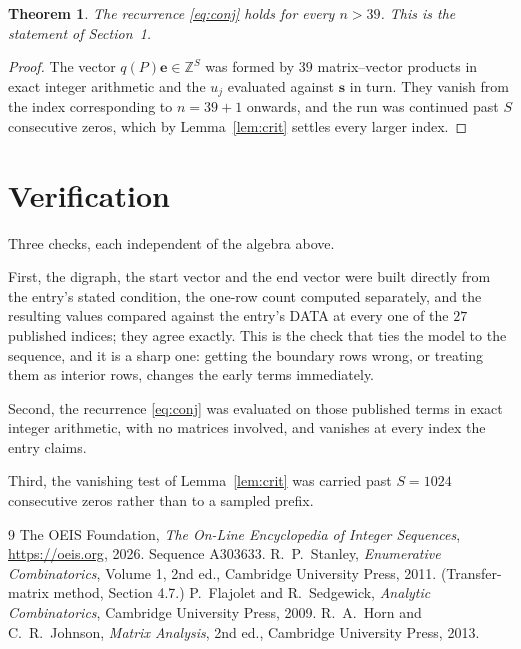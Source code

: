 \documentclass[11pt,a4paper]{article}
\theoremstyle{plain}
\newtheorem{theorem}{Theorem}
\theoremstyle{definition}
\begin{document}
\begin{theorem}
The recurrence \eqref{eq:conj} holds for every $n>39$. This is the statement of
Section~1.
\end{theorem}

\begin{proof}
The vector $q(P)\mathbf{e}\in\mathbb{Z}^{S}$ was formed by $39$ matrix--vector
products in exact integer arithmetic and the $u_j$ evaluated against $\mathbf{s}$ in turn.
They vanish from the index corresponding to $n=39+1$ onwards, and the run was continued
past $S$ consecutive zeros, which by Lemma~\ref{lem:crit} settles every larger index.
\end{proof}

\section{Verification}

Three checks, each independent of the algebra above.

First, the digraph, the start vector and the end vector were built directly from the
entry's stated condition, the one-row count computed separately, and the resulting values
compared against the entry's DATA at every one of the $27$ published indices; they
agree exactly. This is the check that ties the model to the sequence, and it is a sharp one:
getting the boundary rows wrong, or treating them as interior rows, changes the early terms
immediately.

Second, the recurrence \eqref{eq:conj} was evaluated on those published terms in exact
integer arithmetic, with no matrices involved, and vanishes at every index the entry claims.

Third, the vanishing test of Lemma~\ref{lem:crit} was carried past $S=1024$ consecutive
zeros rather than to a sampled prefix.

\begin{thebibliography}{9}
 The OEIS Foundation, \emph{The On-Line Encyclopedia of Integer
Sequences}, \url{https://oeis.org}, 2026. Sequence A303633.
 R.~P.~Stanley, \emph{Enumerative Combinatorics}, Volume 1, 2nd ed.,
Cambridge University Press, 2011. (Transfer-matrix method, Section 4.7.)
 P.~Flajolet and R.~Sedgewick, \emph{Analytic Combinatorics}, Cambridge
University Press, 2009.
 R.~A.~Horn and C.~R.~Johnson, \emph{Matrix Analysis}, 2nd ed., Cambridge
University Press, 2013.
\end{thebibliography}
\end{document}

